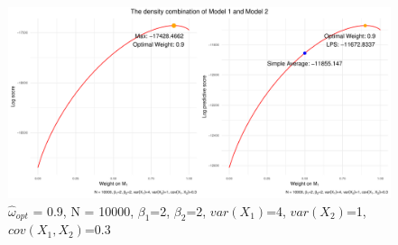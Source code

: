 \begin{frame}[plain]
    \begin{figure}
        \centering
        \includegraphics[scale=0.55]{Graph/LPS_2.pdf}
        \caption{\footnotesize{\alert{$\hat\omega_{opt}$ = 0.9}, N = 10000, $\beta_1$=2, $\beta_2$=2, \alert{$var(X_1)$=4}, \alert{$var(X_2)$=1}, $cov(X_1,X_2)$=0.3}}
    \end{figure}
\end{frame}





